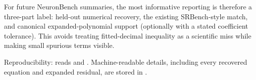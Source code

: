 \documentclass[10pt]{article}
\begin{document}
For future NeuronBench summaries, the most informative reporting is therefore a
three-part label: held-out numerical recovery, the existing SRBench-style match,
and canonical expanded-polynomial support (optionally with a stated coefficient
tolerance).  This avoids treating fitted-decimal inequality as a scientific miss
while making small spurious terms visible.

\vfill
\footnotesize
\raggedright
Reproducibility:  reads
 and
.  Machine-readable
details, including every recovered equation and expanded residual, are stored in
.
\end{document}
